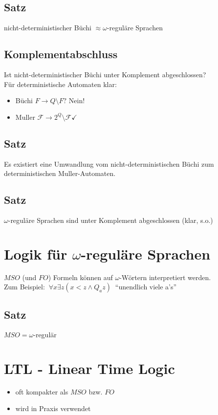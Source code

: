     \subsection{Satz}
        nicht-deterministischer Büchi $\approx\omega$-reguläre Sprachen
    \subsection{Komplementabschluss}
        Ist nicht-deterministischer Büchi unter Komplement abgeschlossen?\\
        Für deterministische Automaten klar:
        \begin{itemize}
            \item Büchi $F\rightarrow Q\setminus F?$ Nein!
            \item Muller $\mathcal{F}\rightarrow 2^Q\setminus\mathcal{F} \checkmark$
        \end{itemize}
    \subsection{Satz}
        Es existiert eine Umwandlung vom nicht-deterministischen Büchi zum deterministischen Muller-Automaten.
    \subsection{Satz}
        $\omega$-reguläre Sprachen sind unter Komplement abgeschlossen (klar, s.o.)
\section{Logik für $\omega$-reguläre Sprachen}
    $MSO$ (und $FO$) Formeln können auf $\omega$-Wörtern interpretiert werden.\\
    Zum Beispiel: $\ \forall x\exists z (x<z\wedge Q_az)\ $ ``unendlich viele a's''
    \subsection{Satz}
        $MSO=\omega$-regulär
\section{LTL - Linear Time Logic}
    \begin{itemize}
        \item oft kompakter als $MSO$ bzw. $FO$
        \item wird in Praxis verwendet
    \end{itemize}

